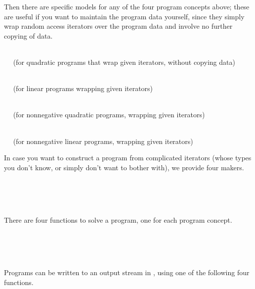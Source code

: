 Then there are specific models for any of the four program concepts above; 
these are useful if you want to maintain the program data yourself, since
they simply wrap random access iterators over the program data and involve
no further copying of data.

\\
$\quad$ (for quadratic programs that wrap given iterators, without copying 
data) 

\\
$\quad$ (for linear programs wrapping given iterators) 

\\
$\quad$ (for nonnegative quadratic programs, wrapping given iterators)

\\
$\quad$ (for nonnegative linear programs, wrapping given iterators)

In case you want to construct a program from complicated iterators
(whose types you don't know, or simply don't want to bother with), 
we provide four makers.

\\
\\
\\

There are four functions to solve a program, one for each program
concept. 

\\
\\
\\

Programs can be written to an output stream in , using
one of the following four functions.

\\
\\
\\
